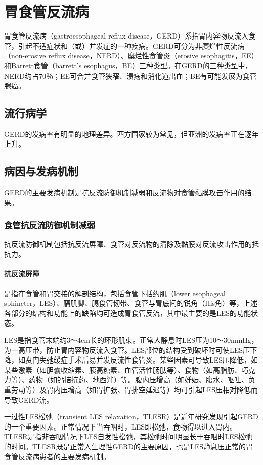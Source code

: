 \section{胃食管反流病}

胃食管反流病（gastroesophageal reflux
disease，GERD）系指胃内容物反流入食管，引起不适症状和（或）并发症的一种疾病。GERD可分为非糜烂性反流病（non-erosive
reflux disease，NERD）、糜烂性食管炎（erosive
esophagitis，EE）和Barrett食管（barrett's
esophagus，BE）三种类型。在GERD的三种类型中，NERD约占70％；EE可合并食管狭窄、溃疡和消化道出血；BE有可能发展为食管腺癌。

\subsection{流行病学}

GERD的发病率有明显的地理差异。西方国家较为常见，但亚洲的发病率正在逐年上升。

\subsection{病因与发病机制}

GERD的主要发病机制是抗反流防御机制减弱和反流物对食管黏膜攻击作用的结果。

\subsubsection{食管抗反流防御机制减弱}

抗反流防御机制包括抗反流屏障、食管对反流物的清除及黏膜对反流攻击作用的抵抗力。
\paragraph{抗反流屏障}

是指在食管和胃交接的解剖结构，包括食管下括约肌（lower esophageal
sphincter，LES）、膈肌脚、膈食管韧带、食管与胃底间的锐角（His角）等，上述各部分的结构和功能上的缺陷均可造成胃食管反流，其中最主要的是LES的功能状态。

LES是指食管末端约3～4cm长的环形肌束。正常人静息时LES压为10～30mmHg，为一高压带，防止胃内容物反流入食管。LES部位的结构受到破坏时可使LES压下降，如贲门失弛缓症手术后易并发反流性食管炎。某些因素可导致LES压降低，如某些激素（如胆囊收缩素、胰高糖素、血管活性肠肽等）、食物（如高脂肪、巧克力等）、药物（如钙拮抗药、地西泮）等。腹内压增高（如妊娠、腹水、呕吐、负重劳动等）及胃内压增高（如胃扩张、胃排空延迟等）均可引起LES压相对降低而导致GERD流。

一过性LES松弛（transient LES
relaxation，TLESR）是近年研究发现引起GERD的一个重要因素。正常情况下当吞咽时，LES即松弛，食物得以进入胃内。TLESR是指非吞咽情况下LES自发性松弛，其松弛时间明显长于吞咽时LES松弛的时间。TLESR既是正常人生理性GERD的主要原因，也是LES静息压正常的胃食管反流病患者的主要发病机制。
